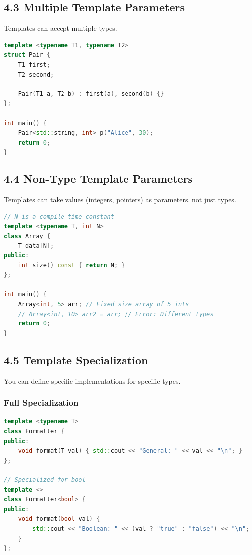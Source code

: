 \hypertarget{multiple-template-parameters}{%
\subsection{4.3 Multiple Template
Parameters}\label{multiple-template-parameters}}

Templates can accept multiple types.

\begin{lstlisting}[language={C++}]
template <typename T1, typename T2>
struct Pair {
    T1 first;
    T2 second;
    
    Pair(T1 a, T2 b) : first(a), second(b) {}
};

int main() {
    Pair<std::string, int> p("Alice", 30);
    return 0;
}
\end{lstlisting}

\hypertarget{non-type-template-parameters}{%
\subsection{4.4 Non-Type Template
Parameters}\label{non-type-template-parameters}}

Templates can take values (integers, pointers) as parameters, not just
types.

\begin{lstlisting}[language={C++}]
// N is a compile-time constant
template <typename T, int N>
class Array {
    T data[N];
public:
    int size() const { return N; }
};

int main() {
    Array<int, 5> arr; // Fixed size array of 5 ints
    // Array<int, 10> arr2 = arr; // Error: Different types
    return 0;
}
\end{lstlisting}

\hypertarget{template-specialization}{%
\subsection{4.5 Template Specialization}\label{template-specialization}}

You can define specific implementations for specific types.

\hypertarget{full-specialization}{%
\subsubsection{Full Specialization}\label{full-specialization}}

\begin{lstlisting}[language={C++}]
template <typename T>
class Formatter {
public:
    void format(T val) { std::cout << "General: " << val << "\n"; }
};

// Specialized for bool
template <> 
class Formatter<bool> {
public:
    void format(bool val) { 
        std::cout << "Boolean: " << (val ? "true" : "false") << "\n"; 
    } 
};
\end{lstlisting}

